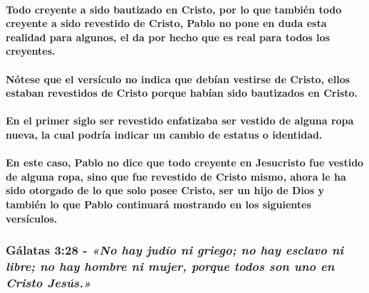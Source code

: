 \documentclass[11a pt,twoside]{article}
\newcommand{\scripture}[1]{%
  {\fontsize{12pt}{16pt}\selectfont\ScriptureFont\itshape #1}%
}
\let\oldsubsubsection\subsubsection
\renewcommand{\subsubsection}{\needspace{4\baselineskip}\oldsubsubsection}
\let\oldparagraph\paragraph
\renewcommand{\paragraph}{\needspace{3\baselineskip}\oldparagraph}
\begin{document}
\paragraph{Todo creyente a sido bautizado en Cristo, por lo que también
todo creyente a sido revestido de Cristo, Pablo no pone en duda esta
realidad para algunos, el da por hecho que es real para todos los
creyentes.}\label{todo-creyente-a-sido-bautizado-en-cristo-por-lo-que-tambiuxe9n-todo-creyente-a-sido-revestido-de-cristo-pablo-no-pone-en-duda-esta-realidad-para-algunos-el-da-por-hecho-que-es-real-para-todos-los-creyentes.}

\paragraph{Nótese que el versículo no indica que debían vestirse de
Cristo, ellos estaban revestidos de Cristo porque habían sido bautizados
en
Cristo.}\label{nuxf3tese-que-el-versuxedculo-no-indica-que-debuxedan-vestirse-de-cristo-ellos-estaban-revestidos-de-cristo-porque-habuxedan-sido-bautizados-en-cristo.}

\paragraph{En el primer siglo ser revestido enfatizaba ser vestido de
alguna ropa nueva, la cual podría indicar un cambio de estatus o
identidad.}\label{en-el-primer-siglo-ser-revestido-enfatizaba-ser-vestido-de-alguna-ropa-nueva-la-cual-podruxeda-indicar-un-cambio-de-estatus-o-identidad.}

\paragraph{En este caso, Pablo no dice que todo creyente en Jesucristo
fue vestido de alguna ropa, sino que fue revestido de Cristo mismo,
ahora le ha sido otorgado de lo que solo posee Cristo, ser un hijo de
Dios y también lo que Pablo continuará mostrando en los siguientes
versículos.}\label{en-este-caso-pablo-no-dice-que-todo-creyente-en-jesucristo-fue-vestido-de-alguna-ropa-sino-que-fue-revestido-de-cristo-mismo-ahora-le-ha-sido-otorgado-de-lo-que-solo-posee-cristo-ser-un-hijo-de-dios-y-tambiuxe9n-lo-que-pablo-continuaruxe1-mostrando-en-los-siguientes-versuxedculos.}

\subsubsection{\texorpdfstring{Gálatas 3:28 -
\scripture{«No hay judío ni griego; no hay esclavo ni libre; no hay hombre ni mujer, porque todos son uno en Cristo Jesús.»}}{Gálatas 3:28 - }}\label{guxe1latas-328---no-hay-juduxedo-ni-griego-no-hay-esclavo-ni-libre-no-hay-hombre-ni-mujer-porque-todos-son-uno-en-cristo-jesuxfas.}
\end{document}
